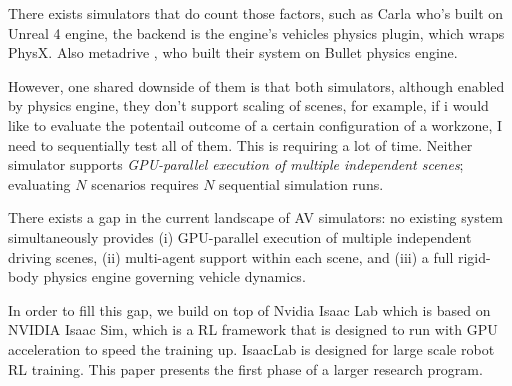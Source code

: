 There exists simulators that do count those factors, such as Carla \cite{dosovitskiy_carla_2017} who's built on Unreal 4 engine, the backend is the engine's vehicles physics plugin, which wraps PhysX. Also metadrive \cite{li_metadrive_2022}, who built their system on Bullet physics engine.
%

However, one shared downside of them is that both simulators, although enabled by physics engine, they don't support scaling of scenes, for example, if i would like to evaluate the potentail outcome of a certain configuration of a workzone, I need to sequentially test all of them. This is requiring a lot of time. Neither simulator supports \emph{GPU-parallel execution of multiple independent scenes}; evaluating $N$ scenarios requires $N$ sequential simulation runs.
%

There exists a gap in the current landscape of AV simulators: no existing system simultaneously provides (i) GPU-parallel execution of multiple independent driving scenes, (ii) multi-agent support within each scene, and (iii) a full rigid-body physics engine governing vehicle dynamics.
%

In order to fill this gap, we build on top of Nvidia Isaac Lab which is based on NVIDIA Isaac Sim\cite{nvidia_isaac_2025}, which is a RL framework that is designed to run with GPU acceleration to speed the training up. IsaacLab is designed for large scale robot RL training. This paper presents the first phase of a larger research program.
%

